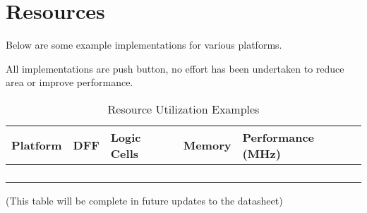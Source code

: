 \chapter{Resources}\label{resources}

Below are some example implementations for various platforms.

All implementations are push button, no effort has been undertaken to
reduce area or improve performance.

\setlength\LTleft{0pt}
\setlength\LTright{0pt}

\begin{longtable}[]{@{\extracolsep{\fill}}lllll@{}}
	\toprule
	Platform & DFF & Logic Cells & Memory & Performance (MHz)\tabularnewline
	\midrule
	\endhead
	& & & &\tabularnewline
	& & & &\tabularnewline
	& & & &\tabularnewline
	\bottomrule
	\caption{Resource Utilization Examples}
\end{longtable}

(This table will be complete in future updates to the datasheet)
